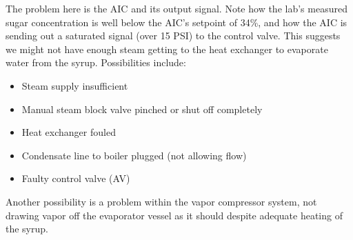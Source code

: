 
The problem here is the AIC and its output signal.  Note how the lab's measured sugar concentration is well below the AIC's setpoint of 34\%, and how the AIC is sending out a saturated signal (over 15 PSI) to the control valve.  This suggests we might not have enough steam getting to the heat exchanger to evaporate water from the syrup.  Possibilities include:

\begin{itemize}
\item{} Steam supply insufficient
\item{} Manual steam block valve pinched or shut off completely
\item{} Heat exchanger fouled
\item{} Condensate line to boiler plugged (not allowing flow)
\item{} Faulty control valve (AV)
\end{itemize}

Another possibility is a problem within the vapor compressor system, not drawing vapor off the evaporator vessel as it should despite adequate heating of the syrup.




